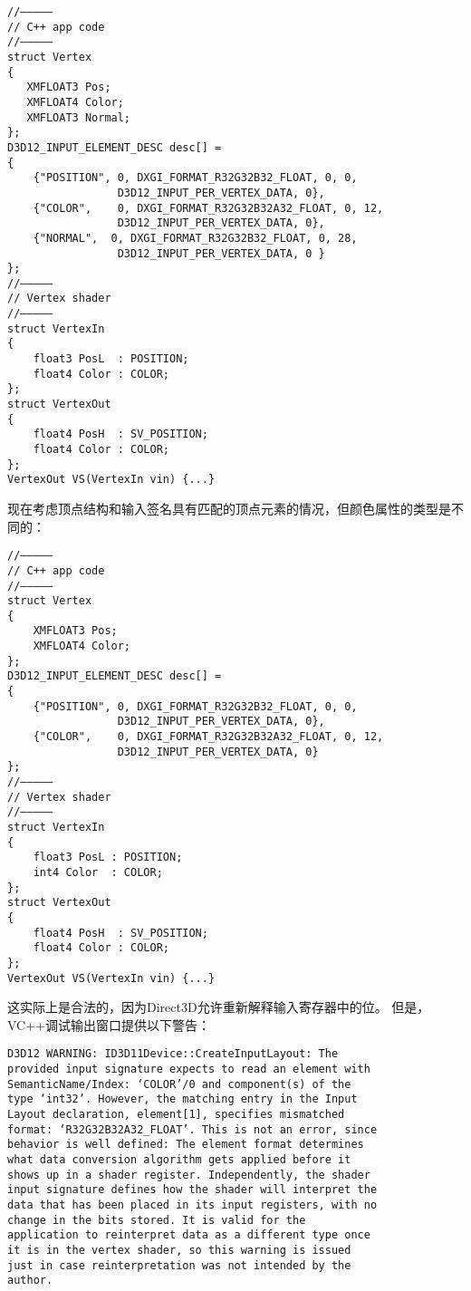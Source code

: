 \begin{lstlisting}
//––––—
// C++ app code
//––––—
struct Vertex
{
   XMFLOAT3 Pos;
   XMFLOAT4 Color;
   XMFLOAT3 Normal;
};
D3D12_INPUT_ELEMENT_DESC desc[] =
{
    {"POSITION", 0, DXGI_FORMAT_R32G32B32_FLOAT, 0, 0,
                 D3D12_INPUT_PER_VERTEX_DATA, 0},
    {"COLOR",    0, DXGI_FORMAT_R32G32B32A32_FLOAT, 0, 12,
                 D3D12_INPUT_PER_VERTEX_DATA, 0},
    {"NORMAL",  0, DXGI_FORMAT_R32G32B32_FLOAT, 0, 28,
                 D3D12_INPUT_PER_VERTEX_DATA, 0 }
};
//––––—
// Vertex shader
//––––—
struct VertexIn
{
    float3 PosL  : POSITION;
    float4 Color : COLOR;
};
struct VertexOut
{
    float4 PosH  : SV_POSITION;
    float4 Color : COLOR;
};
VertexOut VS(VertexIn vin) {...}
\end{lstlisting}
\begin{flushleft}
现在考虑顶点结构和输入签名具有匹配的顶点元素的情况，但颜色属性的类型是不同的：\\
\end{flushleft}
\begin{lstlisting}
//––––—
// C++ app code
//––––—
struct Vertex
{
    XMFLOAT3 Pos;
    XMFLOAT4 Color;
};
D3D12_INPUT_ELEMENT_DESC desc[] =
{
    {"POSITION", 0, DXGI_FORMAT_R32G32B32_FLOAT, 0, 0,
                 D3D12_INPUT_PER_VERTEX_DATA, 0},
    {"COLOR",    0, DXGI_FORMAT_R32G32B32A32_FLOAT, 0, 12,
                 D3D12_INPUT_PER_VERTEX_DATA, 0}
};
//––––—
// Vertex shader
//––––—
struct VertexIn
{
    float3 PosL : POSITION;
    int4 Color  : COLOR;
};
struct VertexOut
{
    float4 PosH  : SV_POSITION;
    float4 Color : COLOR;
};
VertexOut VS(VertexIn vin) {...}
\end{lstlisting}

\begin{flushleft}
这实际上是合法的，因为Direct3D允许重新解释输入寄存器中的位。 但是，VC++调试输出窗口提供以下警告：\\
\end{flushleft}
\begin{lstlisting}
D3D12 WARNING: ID3D11Device::CreateInputLayout: The
provided input signature expects to read an element with
SemanticName/Index: ‘COLOR’/0 and component(s) of the
type ‘int32’. However, the matching entry in the Input
Layout declaration, element[1], specifies mismatched
format: ‘R32G32B32A32_FLOAT’. This is not an error, since
behavior is well defined: The element format determines
what data conversion algorithm gets applied before it
shows up in a shader register. Independently, the shader
input signature defines how the shader will interpret the
data that has been placed in its input registers, with no
change in the bits stored. It is valid for the
application to reinterpret data as a different type once
it is in the vertex shader, so this warning is issued
just in case reinterpretation was not intended by the
author.
\end{lstlisting}

